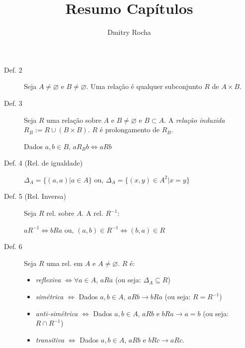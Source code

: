 \documentclass[11pt]{article}
\author{Dmitry Rocha}
\title{Resumo Capítulos}
\begin{document}
\newcommand{\defi}{Def. }
\newcommand{\prop}{P}
\newcommand{\teor}{T}
\newcommand{\coro}{C}
\newcommand{\lema}{L}
\newcommand{\obse}{Obs.}

\maketitle




\begin{description}
  \item[\defi 2] Seja $A \neq \varnothing$ e $B \neq \varnothing$. Uma relação é
    qualquer subconjunto $R$ de $A \times B$.
  \item[\defi 3] Seja $R$ uma relação sobre $A$ e $B \neq \varnothing$ e $B \subset
    A$. A \emph{relação induzida} $R_B := R \cup (B\times B)$. $R$ é
    prolongamento de $R_B$.

    Dados $a,b \in B$, $aR_B b \iff aRb$

  \item[\defi 4 (Rel. de igualdade)]

    $\Delta _A = \{ (a, a) | a \in A\}$ ou,
    $\Delta _A = \{(x, y) \in A^2 | x = y\}$

  \item[\defi 5 (Rel. Inversa)] Seja $R$ rel. sobre $A$. A rel. $R^{-1}$:

    $aR^{-1} \iff bRa$ ou,
    $(a, b) \in R^{-1} \iff (b,a) \in R$

  \item[\defi 6] Seja $R$ uma rel. em $A$ e $A\neq \varnothing$. $R$ é:
    \begin{itemize}
      \item \emph{reflexiva} $\iff \forall a \in A$, $aRa$ (ou seja: $\Delta _A
        \subseteq R$)
      \item \emph{simétrica} $\iff$ Dados $a, b \in A$, $aRb \to bRa$ (ou seja:
        $R=R^{-1}$)
      \item \emph{anti-simétrica} $\iff$ Dados $a, b \in A$, $aRb$ e $bRa \to a
        = b$ (ou seja: $R \cap R^{-1}$)
      \item \emph{transitiva} $\iff$ Dados $a, b \in A$, $aRb$ e $bRc \to aRc$.
    \end{itemize}
\end{description}

\end{document}
